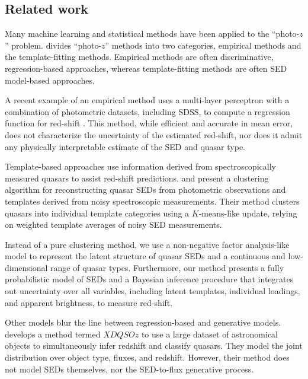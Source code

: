 \documentclass{article}
\begin{document}
\subsection{Related work}
Many machine learning and statistical methods have been applied to the ``photo-$z$'' problem. 
\citet{walcher2011fitting} divides ``photo-$z$'' methods into two categories, empirical methods and the template-fitting methods.  Empirical methods are often discriminative, regression-based approaches, whereas template-fitting methods are often SED model-based approaches.  

A recent example of an empirical method uses a multi-layer perceptron with a combination of photometric datasets, including SDSS, 
to compute a regression function for red-shift \cite{brescia2013photometric}. 
This method, while efficient and accurate in mean error, does not characterize the uncertainty of the estimated red-shift, nor does it admit any physically interpretable estimate of the SED and quasar type.  

Template-based approaches use information derived from spectroscopically measured quasars to assist red-shift predictions.  
\citet{budavari2001photometric} and \citet{richards2001photometric} present a clustering algorithm for reconstructing quasar SEDs from photometric observations and templates derived from noisy spectroscopic measurements.  
Their method clusters quasars into individual template categories using a $K$-means-like update, relying on weighted template averages of noisy SED measurements.  

Instead of a pure clustering method, we use a non-negative factor analysis-like model to represent the latent structure of quasar SEDs and a continuous and low-dimensional range of quasar types.  
Furthermore, our method presents a fully probabilistic model of SEDs and a Bayesian inference procedure that integrates out uncertainty over all variables, including  latent templates, individual loadings, and apparent brightness, to measure red-shift.    

Other models blur the line between regression-based and generative models.  \citet{bovy2012photometric} develops a method termed $XDQSOz$ to use a large dataset of astronomical objects to simultaneously infer redshift and classify quasars.  
They model the joint distribution over object type, fluxes, and redshift.  However, their method does not model SEDs themselves, nor the SED-to-flux generative process. 
\end{document}
